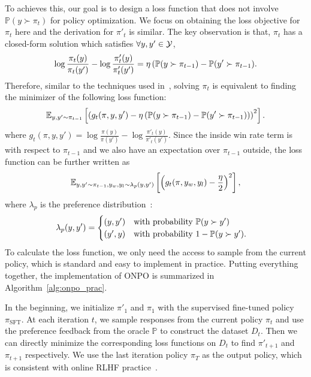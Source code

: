 To achieves this, our goal is to design a loss function that does not involve $\mathbb{P}(y \succ \pi_t)$ for policy optimization. We focus on obtaining the loss objective for $\pi_t$ here and the derivation for $\pi'_t$ is similar. The key observation is that, $\pi_t$ has a closed-form solution which satisfies $\forall y,y' \in \Ycal$,
$$
\log \frac{\pi_t(y)}{\pi_t(y')}-\log \frac{\pi'_t(y)}{\pi'_t(y')}=\eta \pa{\mathbb{P}(y \succ \pi_{t-1}}-\mathbb{P}(y' \succ \pi_{t-1}).
$$
Therefore, similar to the techniques used in~\citet{azar2024general,zhang2024iterative}, solving $\pi_t$ is equivalent to finding the minimizer of the following loss function:
{\small
\begin{align*}
\E_{y,y' \sim \pi_{t-1}}\bra{\pa{g_t(\pi,y,y')-\eta\pa{\mathbb{P}(y \succ \pi_{t-1})-\mathbb{P}(y' \succ \pi_{t-1})}}^2}.
\end{align*}}
\noindent where $g_t(\pi,y,y')=\log \frac{\pi(y)}{\pi(y')}-\log \frac{\pi'_t(y)}{\pi'_t(y')}$. Since the inside win rate term is with respect to $\pi_{t-1}$ and we also have an expectation over $\pi_{t-1}$ outside, the loss function can be further written as
\begin{align*}
\E_{y,y' \sim \pi_{t-1},y_w,y_l \sim \lambda_p(y,y')}\bra{\pa{g_t(\pi,y_w,y_l)-\frac{\eta}{2}}^2},
\end{align*}
where $\lambda_p$ is the preference distribution~\citep{calandriello2024human}:
\begin{align*}
\lambda_p(y,y')=\begin{cases} (y,y') \quad \textrm{with probability $\P(y \succ y')$} \\
(y',y) \quad \textrm{with probability $1- \P(y \succ y')$.}
\end{cases}
\end{align*}
To calculate the loss function, we only need the access to sample from the current policy, which is standard and easy to implement in practice. Putting everything together, the implementation of ONPO is summarized in Algorithm~\ref{alg:onpo_prac}.

In the beginning, we initialize $\pi'_1$ and $\pi_1$ with the supervised fine-tuned policy $\pi_{\textrm{SFT}}$. At each iteration $t$, we sample responses from the current policy $\pi_t$ and use the preference feedback from the oracle $\mathbb{P}$ to construct the dataset $D_t$. Then we can directly minimize the corresponding loss functions on $D_t$ to find $\pi'_{t+1}$ and $\pi_{t+1}$ respectively. We use the last iteration policy $\pi_T$ as the output policy, which is consistent with online RLHF practice~\citep{dong2024rlhf,wu2024self,zhang2024iterative}.

